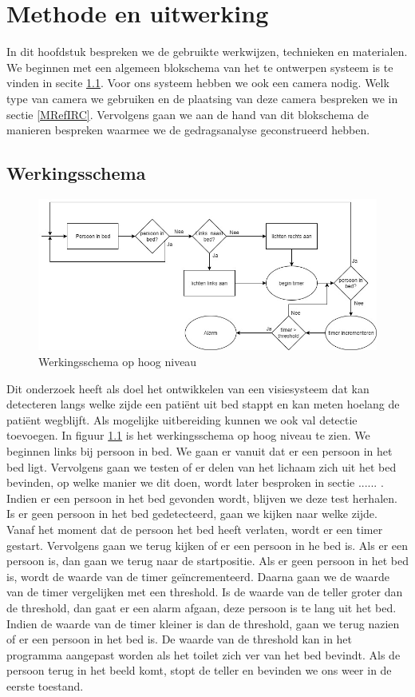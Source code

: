 \chapter{Methode en uitwerking}
\label{mRef}
In dit hoofdstuk bespreken we de gebruikte werkwijzen, technieken en materialen. We beginnen met een algemeen blokschema van het te ontwerpen systeem is te vinden in secite \ref{MRefWeS}. Voor ons systeem hebben we ook een camera nodig. Welk type van camera we gebruiken en de plaatsing van deze camera bespreken we in sectie \ref{MRefIRC}. Vervolgens gaan we aan de hand van dit blokschema de manieren bespreken waarmee we de gedragsanalyse geconstrueerd hebben. 

\section{Werkingsschema}
\label{MRefWeS}
\begin{figure}[hbp]
	\includegraphics[scale=0.5]{HoogNiveauBlokDiagram}
	\caption{Werkingsschema op hoog niveau}
	\label{imgWeS}
\end{figure}
Dit onderzoek heeft als doel het ontwikkelen van een visiesysteem dat kan detecteren langs welke zijde een pati\"ent uit bed stappt en kan meten hoelang de pati\"ent wegblijft. Als mogelijke uitbereiding kunnen we ook val detectie toevoegen. In figuur \ref{imgWeS} is het werkingsschema op hoog niveau te zien.
We beginnen links bij persoon in bed. We gaan er vanuit dat er een persoon in het bed ligt.  Vervolgens gaan we testen of er delen van het lichaam zich uit het bed bevinden, op welke manier we dit doen, wordt later besproken in sectie ...... . Indien er een persoon in het bed gevonden wordt, blijven we deze test herhalen. Is er geen persoon in het bed gedetecteerd, gaan we kijken naar welke zijde. Vanaf het moment dat de persoon het bed heeft verlaten, wordt er een timer gestart. Vervolgens gaan we terug kijken of er een persoon in he bed is. Als er een persoon is, dan gaan we terug naar de startpositie. Als er geen persoon in het bed is, wordt de waarde van de timer ge\"incrementeerd. Daarna gaan we de waarde van de timer vergelijken met een threshold. Is de waarde van de teller groter dan de threshold, dan gaat er een alarm afgaan, deze persoon is te lang uit het bed. Indien de waarde van de timer kleiner is dan de threshold, gaan we terug nazien of er een persoon in het bed is.  De waarde van de threshold kan in het programma aangepast worden als het toilet zich ver van het bed bevindt.  Als de persoon terug in het beeld komt, stopt de teller en bevinden we ons weer in de eerste toestand.

